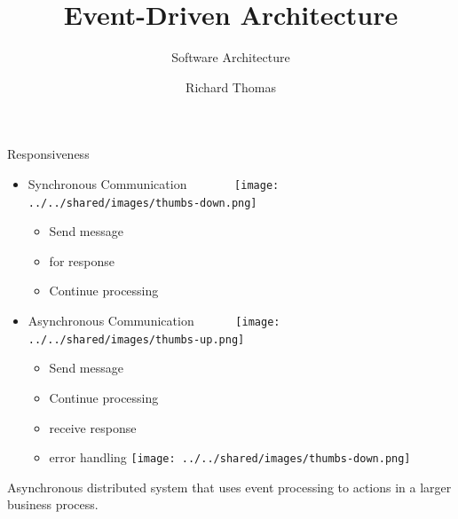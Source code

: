 \documentclass{slide}
\title{Event-Driven Architecture}
\subtitle{Software Architecture}
\author{Richard Thomas}
\date{\week{6}}
\begin{document}
\maketitle




\begin{frame}{Responsiveness}
    \vspace{1mm}
    {\LARGE
    \begin{itemize}
        \item Synchronous Communication ~~~~~~~\texttt{[image: ../../shared/images/thumbs-down.png]}
        \begin{itemize}
            \Large\item Send message
            \Large\item {} for response
            \Large\item Continue processing
        \end{itemize}
        \vspace{3mm}
        \item<2-> Asynchronous Communication ~~~~~~\texttt{[image: ../../shared/images/thumbs-up.png]}
        \begin{itemize}
            \Large\item Send message
            \Large\item Continue processing
            \Large\item {} receive response
            \Large\item {} error handling
                        \tabto{16em}\texttt{[image: ../../shared/images/thumbs-down.png]}
	\end{itemize}
    \end{itemize}
    }
\end{frame}

{Asynchronous distributed system that uses event processing to  actions in a larger business process.}
\end{document}
